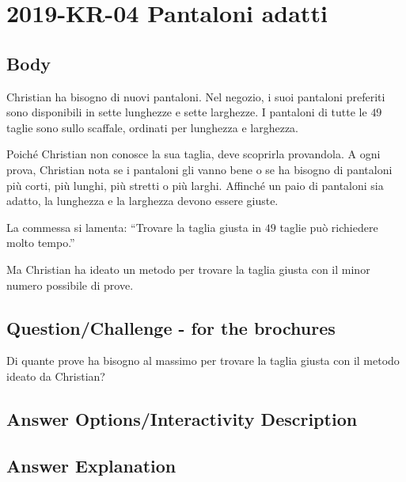\documentclass[a4paper,11pt]{report}
\newcommand{\taskGraphicsFolder}{..}
\begin{document}
\section*{\centering{} 2019-KR-04 Pantaloni adatti}


\subsection*{Body}

Christian ha bisogno di nuovi pantaloni. Nel negozio, i suoi pantaloni preferiti sono disponibili in sette lunghezze e sette larghezze. I pantaloni di tutte le $49$ taglie sono sullo scaffale, ordinati per lunghezza e larghezza.

Poiché Christian non conosce la sua taglia, deve scoprirla provandola.
A ogni prova, Christian nota se i pantaloni gli vanno bene o se ha bisogno di pantaloni più corti, più lunghi, più stretti o più larghi.
Affinché un paio di pantaloni sia adatto, la lunghezza e la larghezza devono essere giuste.

{\centering%
\par}

La commessa si lamenta: \enquote{Trovare la taglia giusta in $49$ taglie può richiedere molto tempo.}

Ma Christian ha ideato un metodo per trovare la taglia giusta con il minor numero possibile di prove.

{\em


\subsection*{Question/Challenge - for the brochures}

Di quante prove ha bisogno al massimo per trovare la taglia giusta con il metodo ideato da Christian?

}

\begingroup
\renewcommand{\arraystretch}{1.5}
\subsection*{Answer Options/Interactivity Description}



\endgroup

\subsection*{Answer Explanation}
\end{document}
